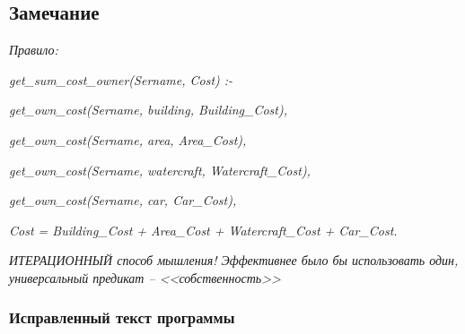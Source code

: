 \documentclass[a4paper,12pt]{article}
\begin{document}
	
	\subsection*{Замечание}
	
	\textit{Правило:}
	
	\textit{get\_sum\_cost\_owner(Sername, Cost) :- }
	
	\textit{get\_own\_cost(Sername, building, Building\_Cost),}
	
	\textit{get\_own\_cost(Sername, area, Area\_Cost),}
	
	\textit{get\_own\_cost(Sername, watercraft, Watercraft\_Cost),}
	
	\textit{get\_own\_cost(Sername, car, Car\_Cost),}
	
	\textit{Cost = Building\_Cost + Area\_Cost + Watercraft\_Cost + Car\_Cost.}
	
	\textit{ИТЕРАЦИОННЫЙ способ мышления! Эффективнее было бы использовать один, универсальный предикат – <<собственность>>}
	
	\subsubsection*{Исправленный текст программы}
	
\end{document}

